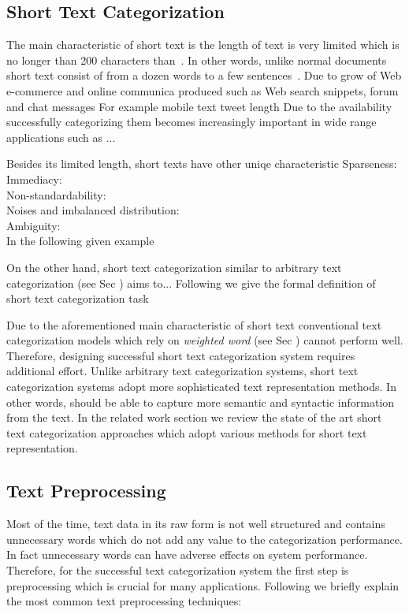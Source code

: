 \subsection{Short Text Categorization}
The main characteristic of short text is the length of text is very limited which is no longer than 200 characters than~\cite{song2014short}. In other words, unlike normal documents short text consist of from a dozen words to a few sentences~\cite{song2014short}. Due to grow of Web e-commerce and online communica produced such as Web search snippets, forum and chat messages
For example mobile text
tweet length
Due to the availability  successfully categorizing them becomes increasingly important in wide range applications such as ...

Besides its limited length, short texts have other uniqe characteristic 
Sparseness:\\
Immediacy:\\
Non-standardability:\\
Noises and imbalanced distribution:\\
Ambiguity:\\
In the following given example 

On the other hand, short text categorization similar to arbitrary text categorization (see Sec ) aims to...
Following we give the formal definition of short text categorization task 

Due to the aforementioned main characteristic of short text conventional text categorization models which rely on \textit{weighted word} (see Sec ) cannot perform well. Therefore, designing successful short text categorization system requires additional effort. Unlike arbitrary text categorization systems, short text categorization systems adopt more sophisticated text representation methods. In other words, should be able to capture more semantic and syntactic information from the text. In the related work section we review the state of the art short text categorization approaches which adopt various methods for short text representation. 

\subsection{Text Preprocessing}
Most of the time, text data in its raw form is not well structured and contains unnecessary words which do not add any value to the categorization performance. In fact unnecessary words can have adverse effects on system performance. Therefore, for the successful text categorization system the first step is preprocessing which is crucial for many applications. Following we briefly explain the most common text preprocessing techniques:

